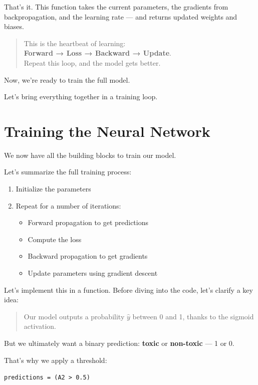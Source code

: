 \documentclass[11pt]{article}
\begin{document}
\bigskip

\noindent That’s it.  
This function takes the current parameters, the gradients from backpropagation, and the learning rate — and returns updated weights and biases.

\begin{quote}
This is the heartbeat of learning:
\\
\textbf{Forward → Loss → Backward → Update}.
\\
Repeat this loop, and the model gets better.
\end{quote}

Now, we’re ready to train the full model.

Let’s bring everything together in a training loop.

\section*{Training the Neural Network}

We now have all the building blocks to train our model.

Let’s summarize the full training process:

\begin{enumerate}
    \item Initialize the parameters
    \item Repeat for a number of iterations:
    \begin{itemize}
        \item Forward propagation to get predictions
        \item Compute the loss
        \item Backward propagation to get gradients
        \item Update parameters using gradient descent
    \end{itemize}
\end{enumerate}

Let’s implement this in a function. Before diving into the code, let’s clarify a key idea:

\begin{quote}
Our model outputs a probability $\hat{y}$ between 0 and 1, thanks to the sigmoid activation.
\end{quote}

But we ultimately want a binary prediction:  
\textbf{toxic} or \textbf{non-toxic} — 1 or 0.

That’s why we apply a threshold:

\begin{center}
\texttt{predictions = (A2 > 0.5)}
\end{center}
\end{document}
